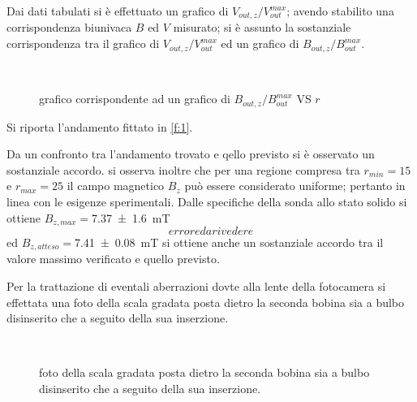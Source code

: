 	Dai dati tabulati si è effettuato un grafico di $V_{out,z}/V_{out}^{max}$;
	avendo stabilito una corrispondenza biunivaca $B$ ed $V$ misurato;
	si è assunto la sostanziale corrispondenza tra il grafico di $V_{out,z}/V_{out}^{max}$ ed un grafico di $B_{out,z}/B_{out}^{max}$.
	\begin{figure}[hb]
		\centering
		\\
		\caption{grafico corrispondente ad un grafico di $B_{out,z}/B_{out}^{max}$ VS $r$}
		\label{fig:fit1}
	\end{figure}
	
	
	
	Si riporta l'andamento fittato in \figurename{ \ref{f:1}}.
	
	Da un confronto tra l'andamento trovato e qello previsto
	si è osservato un sostanziale accordo.
	si osserva inoltre che per una regione compresa tra $r_{min}=15$ e $r_{max}=25$ 
	il campo magnetico $B_z$ può essere considerato uniforme; pertanto in linea con 
	le esigenze sperimentali.
	Dalle specifiche della sonda allo stato solido si ottiene $B_{z,max}= $\SI{7.37	\pm 1.6	}{\milli \tesla}
	$$errore da rivedere$$ ed	$B_{z,atteso}= $\SI{7.41	\pm 0.08	}{\milli \tesla} si ottiene anche un sostanziale accordo tra il valore massimo verificato e quello previsto.
	
	Per la trattazione di eventali aberrazioni dovte alla lente della fotocamera
	si effettata una foto della scala gradata posta dietro la seconda bobina sia a bulbo disinserito che a seguito della sua inserzione.
	\begin{figure}[hb]
		\centering
		\\
		\caption{foto della scala gradata posta dietro la seconda bobina sia a bulbo disinserito che a seguito della sua inserzione.}
		\label{f:scala}
	\end{figure}
	
	
	
	
	
	
	
	
	
	
	
	
	
	
	
	
	
	
	
	
	
	